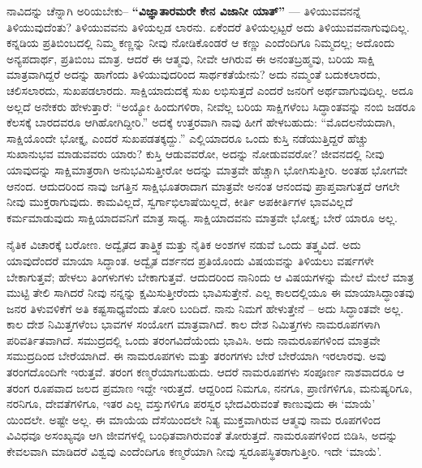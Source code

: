 ನಾವಿದನ್ನು ಚೆನ್ನಾಗಿ ಅರಿಯಬೇಕು– \textbf{“ವಿಜ್ಞಾತಾರಮರೇ ಕೇನ ವಿಜಾನೀ ಯಾತ್​”} — ತಿಳಿಯುವವನನ್ನೆ ತಿಳಿಯುವುದೆಂತು? ತಿಳಿಯುವವನು ತಿಳಿಯಲ್ಪಡ ಲಾರನು. ಏಕೆಂದರೆ ತಿಳಿಯಲ್ಪಟ್ಟರೆ ಅದು ತಿಳಿಯುವವನಾಗುವುದಿಲ್ಲ. ಕನ್ನಡಿಯ ಪ್ರತಿಬಿಂಬದಲ್ಲಿ ನಿಮ್ಮ ಕಣ್ಣನ್ನು ನೀವು ನೋಡಿಕೊಂಡರೆ ಆ ಕಣ್ಣು ಎಂದೆಂದಿಗೂ ನಿಮ್ಮದಲ್ಲ; ಅದೊಂದು ಅನ್ಯಪದಾರ್ಥ, ಪ್ರತಿಬಿಂಬ ಮಾತ್ರ. ಆದರೆ ಈ ಆತ್ಮವು, ನೀವೇ ಆಗಿರುವ ಈ ಅನಂತಬ್ರಹ್ಮವು, ಬರಿಯ ಸಾಕ್ಷಿ ಮಾತ್ರವಾಗಿದ್ದರೆ ಅದನ್ನು ಹಾಗೆಂದು ತಿಳಿಯುವುದರಿಂದ ಸಾರ್ಥಕತೆಯೇನು? ಅದು ನಮ್ಮಂತೆ ಬದುಕಲಾರದು, ಚಲಿಸಲಾರದು, ಸುಖಪಡಲಾರದು. ಸಾಕ್ಷಿಯಾದುದಕ್ಕೆ ಸುಖ ಲಭಿಸುತ್ತದೆ ಎಂದರೆ ಜನರಿಗೆ ಅರ್ಥವಾಗುವುದಿಲ್ಲ. ಅದೂ ಅಲ್ಲದೆ ಅನೇಕರು ಹೇಳುತ್ತಾರೆ: “ಅಯ್ಯೋ ಹಿಂದುಗಳಿರಾ, ನೀವೆಲ್ಲ ಬರಿಯ ಸಾಕ್ಷಿಗಳೆಂಬ ಸಿದ್ಧಾಂತವನ್ನು ನಂಬಿ ಜಡರೂ ಕೆಲಸಕ್ಕೆ ಬಾರದವರೂ ಆಗಿಹೋಗಿದ್ದೀರಿ.” ಅದಕ್ಕೆ ಉತ್ತರವಾಗಿ ನಾವು ಹೀಗೆ ಹೇಳಬಹುದು: “ಮೊದಲನೆಯದಾಗಿ, ಸಾಕ್ಷಿಯೊಂದೇ ಭೋಕ್ತೃ, ಎಂದರೆ ಸುಖಪಡತಕ್ಕದ್ದು.” ಎಲ್ಲಿಯಾದರೂ ಒಂದು ಕುಸ್ತಿ ನಡೆಯುತ್ತಿದ್ದರೆ ಹೆಚ್ಚು ಸುಖಾನುಭವ ಮಾಡುವವರು ಯಾರು? ಕುಸ್ತಿ ಆಡುವವರೋ, ಅದನ್ನು ನೋಡುವವರೋ? ಜೀವನದಲ್ಲಿ ನೀವು ಯಾವುದನ್ನು ಸಾಕ್ಷಿಮಾತ್ರರಾಗಿ ಅನುಭವಿಸುತ್ತೀರೋ ಅದನ್ನು ಮಾತ್ರವೇ ಹೆಚ್ಚಾಗಿ ಭೋಗಿಸುತ್ತೀರಿ. ಅಂತಹ ಭೋಗವೇ ಆನಂದ. ಆದುದರಿಂದ ನಾವು ಜಗತ್ತಿನ ಸಾಕ್ಷಿಭೂತರಾದಾಗ ಮಾತ್ರವೇ ಅನಂತ ಆನಂದವು ಪ್ರಾಪ್ತವಾಗುತ್ತದೆ ಆಗಲೇ ನೀವು ಮುಕ್ತರಾಗುವುದು. ಕಾಮವಿಲ್ಲದೆ, ಸ್ವರ್ಗಾಭಿಲಾಷೆಯಿಲ್ಲದೆ, ಕೀರ್ತಿ ಅಪಕೀರ್ತಿಗಳ ಭಾವವಿಲ್ಲದೆ ಕರ್ಮಮಾಡುವುದು ಸಾಕ್ಷಿಯಾದವನಿಗೆ ಮಾತ್ರ ಸಾಧ್ಯ. ಸಾಕ್ಷಿಯಾದವನು ಮಾತ್ರವೇ ಭೋಕ್ತೃ; ಬೇರೆ ಯಾರೂ ಅಲ್ಲ.

ನೈತಿಕ ವಿಚಾರಕ್ಕೆ ಬರೋಣ. ಅದ್ವೈತದ ತಾತ್ತ್ವಿಕ ಮತ್ತು ನೈತಿಕ ಅಂಶಗಳ ನಡುವೆ ಒಂದು ತತ್ತ್ವವಿದೆ. ಅದು ಯಾವುದೆಂದರೆ ಮಾಯಾ ಸಿದ್ಧಾಂತ. ಅದ್ವೈತ ದರ್ಶನದ ಪ್ರತಿಯೊಂದು ವಿಷಯವನ್ನು ತಿಳಿಯಲು ವರ್ಷಗಳೇ ಬೇಕಾಗುತ್ತವೆ; ಹೇಳಲು ತಿಂಗಳುಗಳು ಬೇಕಾಗುತ್ತವೆ. ಆದುದರಿಂದ ನಾನಿಂದು ಆ ವಿಷಯಗಳನ್ನು ಮೇಲೆ ಮೇಲೆ ಮಾತ್ರ ಮುಟ್ಟಿ ತೇಲಿ ಸಾಗಿದರೆ ನೀವು ನನ್ನನ್ನು ಕ್ಷಮಿಸುತ್ತೀರೆಂದು ಭಾವಿಸುತ್ತೇನೆ. ಎಲ್ಲ ಕಾಲದಲ್ಲಿಯೂ ಈ ಮಾಯಾಸಿದ್ಧಾಂತವು ಜನರ ತಿಳುವಳಿಕೆಗೆ ಅತಿ ಕಷ್ಟಸಾಧ್ಯವೆಂದು ತೋರಿ ಬಂದಿದೆ. ನಾನು ನಿಮಗೆ ಹೇಳುತ್ತೇನೆ – ಅದು ಸಿದ್ಧಾಂತವೇ ಅಲ್ಲ. ಕಾಲ ದೇಶ ನಿಮಿತ್ತಗಳೆಂಬ ಭಾವಗಳ ಸಂಯೋಗ ಮಾತ್ರವಾಗಿದೆ. ಕಾಲ ದೇಶ ನಿಮಿತ್ತಗಳು ನಾಮರೂಪಗಳಾಗಿ ಪರಿವರ್ತಿತವಾಗಿದೆ. ಸಮುದ್ರದಲ್ಲಿ ಒಂದು ತರಂಗವಿದೆಯೆಂದು ಭಾವಿಸಿ. ಅದು ನಾಮರೂಪಗಳಿಂದ ಮಾತ್ರವೇ ಸಮುದ್ರದಿಂದ ಬೇರೆಯಾಗಿದೆ. ಈ ನಾಮರೂಪಗಳು ಮತ್ತು ತರಂಗಗಳು ಬೇರೆ ಬೇರೆಯಾಗಿ ಇರಲಾರವು. ಅವು ತರಂಗದೊಂದಿಗೇ ಇರುತ್ತವೆ. ತರಂಗ ಕಣ್ಮರೆಯಾಗಬಹುದು. ಆದರೆ ನಾಮರೂಪಗಳು ಸಂಪೂರ್ಣ ನಾಶವಾದರೂ ಆ ತರಂಗ ರೂಪವಾದ ಜಲದ ಪ್ರಮಾಣ ಇದ್ದೇ ಇರುತ್ತದೆ. ಆದ್ದರಿಂದ ನಿಮಗೂ, ನನಗೂ, ಪ್ರಾಣಿಗಳಿಗೂ, ಮನುಷ್ಯರಿಗೂ, ನರನಿಗೂ, ದೇವತೆಗಳಿಗೂ, ಇತರ ಎಲ್ಲ ವಸ್ತುಗಳಿಗೂ ಪರಸ್ವರ ಭೇದವಿರುವಂತೆ ಕಾಣುವುದು ಈ ‘ಮಾಯೆ’ ಯಿಂದಲೇ. ಅಷ್ಟೇ ಅಲ್ಲ. ಈ ಮಾಯೆಯ ದೆಸೆಯಿಂದಲೇ ನಿತ್ಯ ಮುಕ್ತವಾಗಿರುವ ಆತ್ಮವು ನಾಮ ರೂಪಗಳಿಂದ ವಿವಿಧವೂ ಅಸಂಖ್ಯವೂ ಆಗಿ ಜೀವಗಳಲ್ಲಿ ಬಂಧಿತವಾಗಿರುವಂತೆ ತೋರುತ್ತದೆ. ನಾಮರೂಪಗಳಿಂದ ಬಿಡಿಸಿ, ಅದನ್ನು ಕೇವಲವಾಗಿ ಮಾಡಿದರೆ ವಿಶ್ವವು ಎಂದೆಂದಿಗೂ ಕಣ್ಮರೆಯಾಗಿ ನೀವು ಸ್ವರೂಪಸ್ಥಿತರಾಗುತ್ತೀರಿ. ಇದೇ ‘ಮಾಯೆ’.

